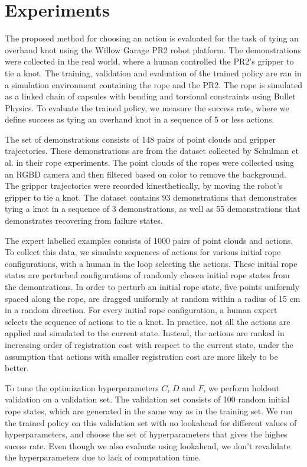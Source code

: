 \section{Experiments}
\label{sec:experiments}

The proposed method for choosing an action is evaluated for the task of tying an overhand knot using the Willow Garage PR2 robot platform. 
The demonstrations were collected in the real world, where a human controlled the PR2's gripper to tie a knot.
The training, validation and evaluation of the trained policy are ran in a simulation environment containing the rope and the PR2.
The rope is simulated as a linked chain of capsules with bending and torsional constraints using Bullet Physics.
To evaluate the trained policy, we measure the success rate, where we define success as tying an overhand knot in a sequence of 5 or less actions.

The set of demonstrations consists of 148 pairs of point clouds and gripper trajectories.
These demonstrations are from the dataset collected by Schulman et al. \cite{Schulmanetal_ISRR2013} in their rope experiments.
The point clouds of the ropes were collected using an RGBD camera and then filtered based on color to remove the background.
The gripper trajectories were recorded kinesthetically, by moving the robot's gripper to tie a knot.
The dataset contains 93 demonstrations that demonstrates tying a knot in a sequence of 3 demonstrations, as well as 55 demonstrations that demonstrates recovering from failure states.

The expert labelled examples consists of 1000 pairs of point clouds and actions.
To collect this data, we simulate sequences of actions for various initial rope configurations, with a human in the loop selecting the actions.
These initial rope states are perturbed configurations of randomly chosen initial rope states from the demontrations.
In order to perturb an initial rope state, five points uniformly spaced along the rope, are dragged uniformly at random within a radius of 15 cm in a random direction.
For every initial rope configuration, a human expert selects the sequence of actions to tie a knot.
In practice, not all the actions are applied and simulated to the current state.
Instead, the actions are ranked in increasing order of registration cost with respect to the current state, under the assumption that actions with smaller registration cost are more likely to be better.

To tune the optimization hyperparameters $C$, $D$ and $F$, we perform holdout validation on a validation set.
The validation set consists of 100 random initial rope states, which are generated in the same way as in the training set.
We run the trained policy on this validation set with no lookahead for different values of hyperparameters, and choose the set of hyperparameters that gives the highes sucess rate. Even though we also evaluate using lookahead, we don't revalidate the hyperparameters due to lack of computation time.

